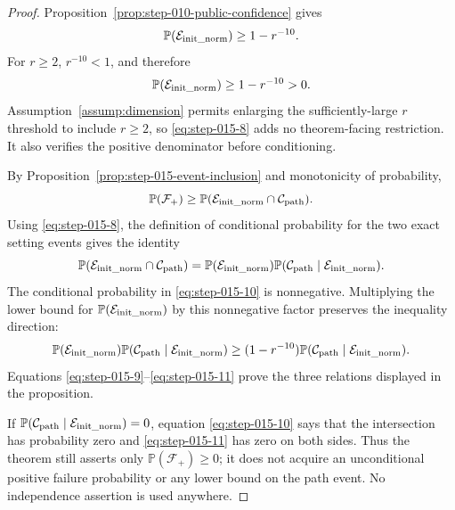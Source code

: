 \begin{proof}
Proposition~\ref{prop:step-010-public-confidence} gives
\[
  \mathbb P(\mathcal E_{\rm init\_norm})\ge1-r^{-10}.
\]
For \(r\ge2\), \(r^{-10}<1\), and therefore
\begin{equation}
  \mathbb P(\mathcal E_{\rm init\_norm})
  \ge1-r^{-10}>0.                                       \label{eq:step-015-8}
\end{equation}
Assumption~\ref{assump:dimension} permits enlarging the sufficiently-large
\(r\) threshold to include \(r\ge2\), so \eqref{eq:step-015-8} adds no theorem-facing
restriction. It also verifies the positive denominator before conditioning.

By Proposition~\ref{prop:step-015-event-inclusion} and monotonicity of
probability,
\begin{equation}
  \mathbb P(\mathcal F_+)
  \ge\mathbb P(\mathcal E_{\rm init\_norm}
    \cap\mathcal C_{\rm path}).                         \label{eq:step-015-9}
\end{equation}
Using \eqref{eq:step-015-8}, the definition of conditional probability for the two exact
setting events gives the identity
\begin{equation}
  \mathbb P(\mathcal E_{\rm init\_norm}
    \cap\mathcal C_{\rm path})
  =\mathbb P(\mathcal E_{\rm init\_norm})
    \mathbb P(\mathcal C_{\rm path}
      \mid\mathcal E_{\rm init\_norm}).                 \label{eq:step-015-10}
\end{equation}
The conditional probability in \eqref{eq:step-015-10} is nonnegative. Multiplying the lower bound for \(\mathbb P(\mathcal E_{\rm init\_norm})\) by this
nonnegative factor preserves the inequality direction:
\begin{equation}
\begin{aligned}
  \mathbb P(\mathcal E_{\rm init\_norm})
    \mathbb P(\mathcal C_{\rm path}
      \mid\mathcal E_{\rm init\_norm})
  \ge(1-r^{-10})
    \mathbb P(\mathcal C_{\rm path}
      \mid\mathcal E_{\rm init\_norm}).
\end{aligned}\label{eq:step-015-11}
\end{equation}
Equations \eqref{eq:step-015-9}--\eqref{eq:step-015-11} prove the three
relations displayed in the proposition.

If
\(\mathbb P(\mathcal C_{\rm path}\mid
\mathcal E_{\rm init\_norm})=0\), equation \eqref{eq:step-015-10} says that the intersection
has probability zero and \eqref{eq:step-015-11} has zero on both sides. Thus the theorem still
asserts only \(\mathbb P(\mathcal F_+)\ge0\); it does not acquire an
unconditional positive failure probability or any lower bound on the path
event. No independence assertion is used anywhere. 

\end{proof}

